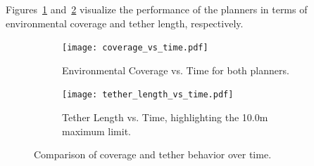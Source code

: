 Figures~\ref{fig:coverage_vs_time} and~\ref{fig:tether_vs_time} visualize the performance of the planners in terms of environmental coverage and tether length, respectively.

\begin{figure}[ht]
    \centering
    \begin{subfigure}[b]{0.48\linewidth}
        \centering
        \texttt{[image: coverage\_vs\_time.pdf]}
        \caption{Environmental Coverage vs. Time for both planners.}
        \label{fig:coverage_vs_time}
    \end{subfigure}
    \hfill
    \begin{subfigure}[b]{0.48\linewidth}
        \centering
        \texttt{[image: tether\_length\_vs\_time.pdf]}
        \caption{Tether Length vs. Time, highlighting the 10.0m maximum limit.}
        \label{fig:tether_vs_time}
    \end{subfigure}
    \caption{Comparison of coverage and tether behavior over time.}
    \label{fig:coverage_tether_sidebyside}
\end{figure}


